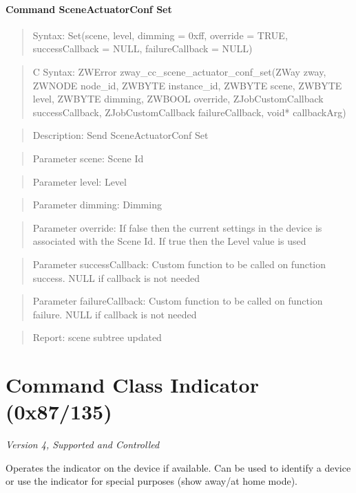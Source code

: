 \paragraph{Command SceneActuatorConf Set}
\begin{quote}Syntax: Set(scene, level, dimming = 0xff, override = TRUE, successCallback = NULL, failureCallback = NULL)\end{quote}
\begin{quote}C Syntax: ZWError zway\_cc\_scene\_actuator\_conf\_set(ZWay zway, ZWNODE node\_id, ZWBYTE instance\_id, ZWBYTE scene, ZWBYTE level, ZWBYTE dimming, ZWBOOL override, ZJobCustomCallback successCallback, ZJobCustomCallback failureCallback, void* callbackArg)\end{quote}
\begin{quote}Description: Send SceneActuatorConf Set\end{quote}
\begin{quote}Parameter scene: Scene Id\end{quote}
\begin{quote}Parameter level: Level\end{quote}
\begin{quote}Parameter dimming: Dimming\end{quote}
\begin{quote}Parameter override: If false then the current settings in the device is associated with the Scene Id. If true then the Level value is used\end{quote}
\begin{quote}Parameter successCallback: Custom function to be called on function success. NULL if callback is not needed\end{quote}
\begin{quote}Parameter failureCallback: Custom function to be called on function failure. NULL if callback is not needed\end{quote}
\begin{quote}Report: scene subtree updated\end{quote}


\section{Command Class Indicator (0x87/135)}

\textit{Version 4, Supported and Controlled}
\newline

Operates the indicator on the device if available. Can be used to identify a device or use the indicator for special purposes (show away/at home mode).
\newline

